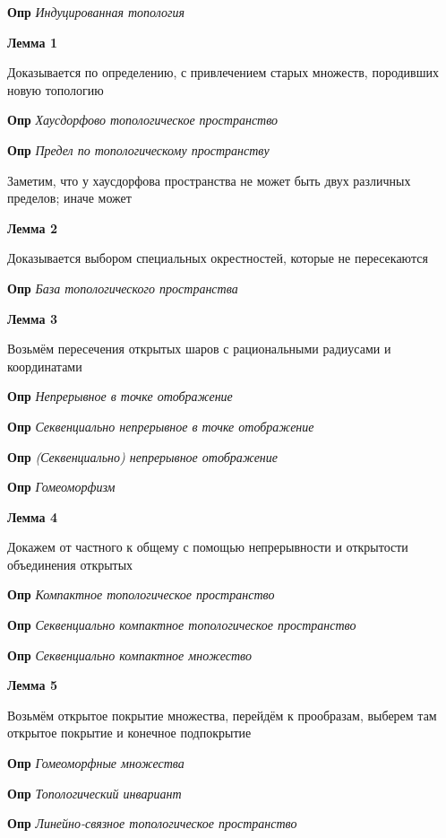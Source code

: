 \documentclass[a4paper, 14pt]{article}
\begin{document}
    \textbf{Опр} \textit{Индуцированная топология}
    
    \textbf{Лемма 1}
    
    Доказывается по определению, с привлечением старых множеств, породивших новую топологию
    
    \textbf{Опр} \textit{Хаусдорфово топологическое пространство}
    
    \textbf{Опр} \textit{Предел по топологическому пространству}
    
    Заметим, что у хаусдорфова пространства не может быть двух различных пределов; иначе может
    
    \textbf{Лемма 2}
    
    Доказывается выбором специальных окрестностей, которые не пересекаются
    
    \textbf{Опр} \textit{База топологического пространства}
    
    \textbf{Лемма 3}
    
    Возьмём пересечения открытых шаров с рациональными радиусами и координатами
    
    \textbf{Опр} \textit{Непрерывное в точке отображение}
    
    \textbf{Опр} \textit{Секвенциально непрерывное в точке отображение}
    
    \textbf{Опр} \textit{(Секвенциально) непрерывное отображение}
    
    \textbf{Опр} \textit{Гомеоморфизм}
    
    \textbf{Лемма 4}
    
    Докажем от частного к общему с помощью непрерывности и открытости объединения открытых
    
    \textbf{Опр} \textit{Компактное топологическое пространство}
    
    \textbf{Опр} \textit{Секвенциально компактное топологическое пространство}
    
    \textbf{Опр} \textit{Секвенциально компактное множество}
    
    \textbf{Лемма 5}
    
    Возьмём открытое покрытие множества, перейдём к прообразам, выберем там открытое покрытие и конечное подпокрытие
    
    \textbf{Опр} \textit{Гомеоморфные множества}
    
    \textbf{Опр} \textit{Топологический инвариант}
    
    \textbf{Опр} \textit{Линейно-связное топологическое пространство}
    
\end{document}
